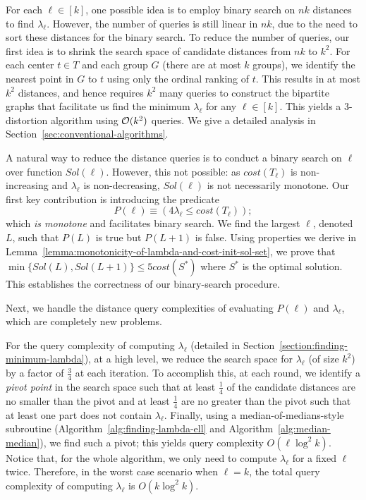 For each $\ell \in [k]$, one possible idea is to employ binary search on $nk$ distances to find $\lambda_{\ell}$. However, the number of queries is still linear in $nk$, due to the need to sort these distances for the binary search.
To reduce the number of queries, our first idea is to shrink the search space of candidate distances from $nk$ to $k^2$. For each center $t \in T$ and each group $G$ (there are at most $k$ groups), we identify the nearest point in $G$ to $t$ using only the ordinal ranking of $t$. 
This results in at most $k^2$ distances, and hence requires $k^2$ many queries to construct the bipartite graphs that facilitate us find the minimum $\lambda_{\ell}$ for any $\ell \in [k]$.
This yields a $3$-distortion algorithm using $\mathcal{O}(k^2)$ queries.
We give a detailed analysis in Section~\ref{sec:conventional-algorithms}. 



A natural way to reduce the distance queries is to conduct a binary search on $\ell$ over function $Sol(\ell)$. However, this not possible:  as $cost(T_{\ell})$ is non-increasing and $\lambda_{\ell}$ is non-decreasing, $Sol(\ell)$ is not necessarily monotone. 
Our first key contribution is introducing the predicate $$P(\ell) \equiv (4 \lambda_{\ell} \leq cost(T_{\ell}));$$
which \emph{is monotone} and facilitates binary search. We find the largest $\ell$, denoted $L$, such that $P(L)$ is true but $P(L+1)$ is false. 
Using properties we derive in Lemma~\ref{lemma:monotonicity-of-lambda-and-cost-init-sol-set}, we prove that $\min\{Sol(L), Sol(L+1)\} \leq 5 cost(S^*)$ where $S^*$ is the optimal solution. This establishes the correctness of our binary-search procedure. 

Next, we handle the distance query complexities of evaluating $P(\ell)$ and $\lambda_{\ell}$, which are completely new problems. 

For the query complexity of computing $\lambda_{\ell}$ (detailed in Section~\ref{section:finding-minimum-lambda}), at a high level, we reduce the search space for $\lambda_{\ell}$ (of size $k^2$) by a factor of $\frac{3}{4}$ at each iteration. To accomplish this, at each round, we identify a \emph{pivot point} in the search space such that at least $\frac{1}{4}$ of the candidate distances are no smaller than the pivot and at least $\frac{1}{4}$ are no greater than the pivot such that at least one part does not contain $\lambda_\ell$. Finally, using a median-of-medians-style subroutine (Algorithm~\ref{alg:finding-lambda-ell} and Algorithm~\ref{alg:median-median}), we find such a pivot; this yields query complexity $O(\ell \log^{2} k)$.
Notice that, for the whole algorithm, we only need to compute $\lambda_{\ell}$ for a fixed $\ell$ twice. Therefore, in the worst case scenario when $\ell = k$, the total query complexity of computing $\lambda_{\ell}$ is $O(k \log^2 k)$.

